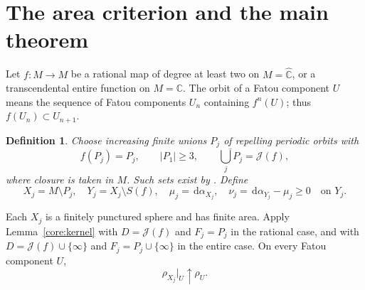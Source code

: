 \documentclass[10pt,a4paper]{amsart}
\newcommand{\C}{\mathbb C}
\newcommand{\sphere}{\widehat{\mathbb C}}
\newcommand{\Jul}{\mathcal J}
\newcommand{\dd}{\,\mathrm d}
\newtheorem{definition}[theorem]{Definition}
\numberwithin{equation}{section}
\begin{document}
\section{The area criterion and the main theorem}\label{sec:global}

Let $f:M\to M$ be a rational map of degree at least two on $M=\sphere$,
or a transcendental entire function on $M=\C$.
The orbit of a Fatou component $U$ means the sequence of Fatou
components $U_n$ containing $f^n(U)$; thus $f(U_n)\subset U_{n+1}$.

\begin{definition}\label{def:marking}
Choose increasing finite unions $P_j$ of repelling periodic orbits with
\begin{equation}\label{core:marks}
 f(P_j)=P_j,\qquad |P_1|\ge3,\qquad
 \overline{\bigcup_jP_j}=\Jul(f),
\end{equation}
where closure is taken in $M$. Such sets exist by
\cite[Theorem~4]{Bergweiler}. Define
\begin{equation}\label{core:background}
 X_j=M\setminus P_j,\quad Y_j=X_j\setminus S(f),\quad
 \mu_j=\dd\alpha_{X_j},\quad
 \nu_j=\dd\alpha_{Y_j}-\mu_j\ge0\quad\text{on }Y_j.
\end{equation}
\end{definition}

Each $X_j$ is a finitely punctured sphere and has finite area.
Apply Lemma~\ref{core:kernel} with $D=\Jul(f)$ and $F_j=P_j$ in the
rational case, and with $D=\Jul(f)\cup\{\infty\}$ and
$F_j=P_j\cup\{\infty\}$ in the entire case. On every Fatou component $U$,
\begin{equation}\label{core:recovery}
 \rho_{X_j}|_U\uparrow\rho_U.
\end{equation}
\end{document}
